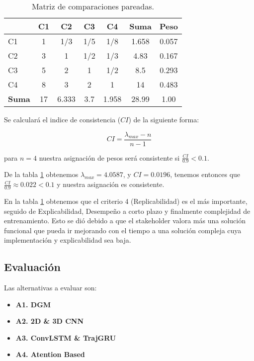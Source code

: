 \begin{table}[H]
  \centering
  \caption{Matriz de comparaciones pareadas.}
  \begin{tabular}{l|cccc|c|c}
     & C1 & C2  & C3  & C4  & \textbf{Suma} & \textbf{Peso}  \\ \hline
  C1 & 1  & 1/3 & 1/5 & 1/8 &  1.658 & 0.057\\
  C2 & 3  & 1   & 1/2 & 1/3 &  4.83  & 0.167\\
  C3 & 5  & 2   & 1   & 1/2 &  8.5   & 0.293\\
  C4 & 8  & 3   & 2   & 1   &  14    & 0.483\\ \hline
  \textbf{Suma} & 17     & 6.333       & 3.7       & 1.958 & 28.99  & 1.00   \\
  \end{tabular}
  \label{tab:comp_pareadas}
\end{table}

Se calculará el indice de consistencia ($CI$) de la siguiente forma:

$$CI = \frac{\lambda_{max}-n}{n-1}$$

para $n = 4$ nuestra asignación de pesos será consistente si $\frac{CI}{0.9} < 0.1$.

De la tabla \ref{tab:comp_pareadas} obtenemos $\lambda_{max} = 4.0587$, y 
$CI = 0.0196$, tenemos entonces que $\frac{CI}{0.9} \approx 0.022 < 0.1$ y 
nuestra asignación es consistente.

En la tabla \ref{tab:comp_pareadas} obtenemos que el criterio 4 
(Replicabilidad) es el más importante, seguido de Explicabilidad, Desempeño a 
corto plazo y finalmente complejidad de entrenamiento. Esto se dió debido a 
que el stakeholder valora más una solución funcional que pueda ir mejorando con 
el tiempo a una solución compleja cuya implementación y explicabilidad sea 
baja.

\subsection{Evaluación}
Las alternativas a evaluar son:

\begin{itemize}
  \item \textbf{A1. DGM}
  \item \textbf{A2. 2D \& 3D CNN} 
  \item \textbf{A3. ConvLSTM \& TrajGRU} 
  \item \textbf{A4. Atention Based}
\end{itemize}

